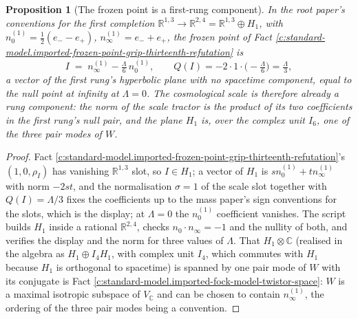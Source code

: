 \documentclass[11pt]{article}
\newtheorem{proposition}[theorem]{Proposition}
\theoremstyle{definition}
\theoremstyle{plain}
\newcommand{\changedmark}[2]{\marginpar{\raggedright\scriptsize\color{#1}#2}}
\providecommand{\C}{}\renewcommand{\C}{\mathbb{C}}
\providecommand{\R}{}\renewcommand{\R}{\mathbb{R}}
\providecommand{\nInf}{}\renewcommand{\nInf}{n_\infty}
\providecommand{\nO}{}\renewcommand{\nO}{n_0}
\begin{document}
\begin{proposition}[The frozen point is a first-rung component]\label{c:standard-model.frozen-point-first-rung-component}
\changedmark{gray}{reworded}
In the root paper's conventions for the first completion $\R^{1,3} \to \R^{2,4} = \R^{1,3} \oplus H_{1}$, with $\nO^{(1)} = \tfrac12(e_{-} - e_{+})$, $\nInf^{(1)} = e_{-} + e_{+}$, the frozen point of Fact \ref{c:standard-model.imported-frozen-point-grip-thirteenth-refutation} is
\[
I \;=\; \nInf^{(1)} - \tfrac{\Lambda}{6}\,\nO^{(1)}, \qquad Q(I) = -2 \cdot 1 \cdot \bigl(-\tfrac{\Lambda}{6}\bigr) = \tfrac{\Lambda}{3},
\]
a vector of the first rung's hyperbolic plane with no spacetime component, equal to the null point at infinity at $\Lambda = 0$. The cosmological scale is therefore already a rung component: the norm of the scale tractor is the product of its two coefficients in the first rung's null pair, and the plane $H_{1}$ is, over the complex unit $I_{6}$, one of the three pair modes of $W$.
\end{proposition}
\begin{proof}
Fact \ref{c:standard-model.imported-frozen-point-grip-thirteenth-refutation}'s $(1, 0, \rho_{I})$ has vanishing $\R^{1,3}$ slot, so $I \in H_{1}$; a vector of $H_{1}$ is $s\nO^{(1)} + t\nInf^{(1)}$ with norm $-2st$, and the normalisation $\sigma = 1$ of the scale slot together with $Q(I) = \Lambda/3$ fixes the coefficients up to the mass paper's sign conventions for the slots, which is the display; at $\Lambda = 0$ the $\nO^{(1)}$ coefficient vanishes. The script builds $H_{1}$ inside a rational $\R^{2,4}$, checks $\nO \cdot \nInf = -1$ and the nullity of both, and verifies the display and the norm for three values of $\Lambda$. That $H_{1} \otimes \C$ (realised in the algebra as $H_{1} \oplus I_{4}H_{1}$, with complex unit $I_{4}$, which commutes with $H_{1}$ because $H_{1}$ is orthogonal to spacetime) is spanned by one pair mode of $W$ with its conjugate is Fact \ref{c:standard-model.imported-fock-model-twistor-space}: $W$ is a maximal isotropic subspace of $V_{\C}$ and can be chosen to contain $\nInf^{(1)}$, the ordering of the three pair modes being a convention.

\end{proof}
\end{document}
